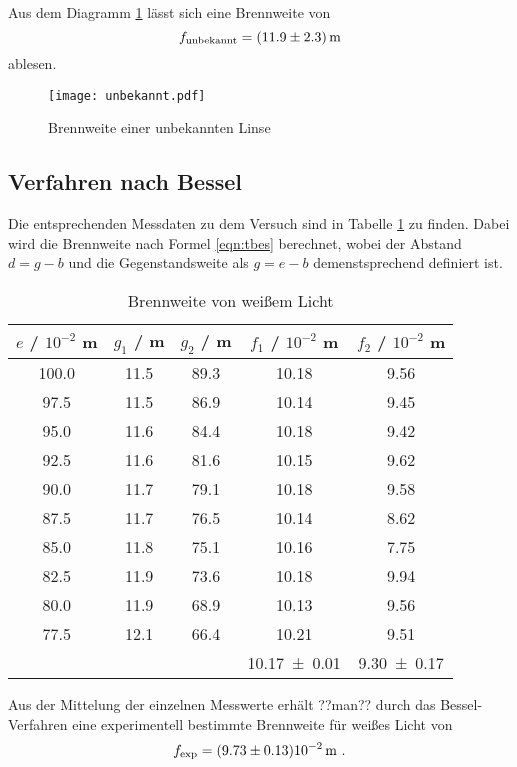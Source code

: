 Aus dem Diagramm \ref{fig:fiunb} lässt sich eine Brennweite von
\begin{equation}
  f_\text{unbekannt} = (\num{11.9 +- 2.3}) \, \text{m}
  \label{eqn:unb}
\end{equation}
ablesen.
\begin{figure}
  \centering
  \texttt{[image: unbekannt.pdf]}
  \caption{Brennweite einer unbekannten Linse}
  \label{fig:fiunb}
\end{figure}
\subsection{Verfahren nach Bessel}
Die entsprechenden Messdaten zu dem Versuch sind in Tabelle \ref{tab:ffw} zu finden. Dabei wird die Brennweite nach Formel \eqref{eqn:tbes} berechnet, wobei der Abstand $d = g - b$ und die Gegenstandsweite als $g = e - b$ demenstsprechend definiert ist.
\begin{table}
  \centering
  \begin{tabular}{c c c | c c}
    \toprule
    $e$ / $10^{-2}$ m & $g_1$ / m & $g_2$ / m & $f_1$ / $10^{-2}$ m & $f_2$ / $10^{-2}$ m\\
    \midrule
	100.0	& 11.5	& 89.3	& 10.18	& 9.56	\\
	97.5	& 11.5	& 86.9	& 10.14	& 9.45	\\
	95.0	& 11.6	& 84.4	& 10.18	& 9.42	\\
	92.5	& 11.6	& 81.6	& 10.15	& 9.62	\\
	90.0	& 11.7	& 79.1	& 10.18	& 9.58	\\
	87.5	& 11.7	& 76.5	& 10.14	& 8.62	\\
	85.0	& 11.8	& 75.1	& 10.16	& 7.75	\\
	82.5	& 11.9	& 73.6	& 10.18	& 9.94	\\
	80.0	& 11.9	& 68.9	& 10.13	& 9.56	\\
	77.5	& 12.1	& 66.4	& 10.21	& 9.51	\\
   \midrule
		&	&	& \num{10.17 +- 0.01} & \num{9.30 +- 0.17} \\
   \bottomrule
  \end{tabular}
  	\caption{Brennweite von weißem Licht}
  \label{tab:ffw}
\end{table}
Aus der Mittelung der einzelnen Messwerte erhält ??man?? durch das Bessel-Verfahren eine experimentell bestimmte Brennweite für weißes Licht von
\begin{equation}
  f_\text{exp} = (\num{9.73 +- 0.13}) 10^{-2} \, \text{m} \ .
  \label{eqn:fexp}
\end{equation}
